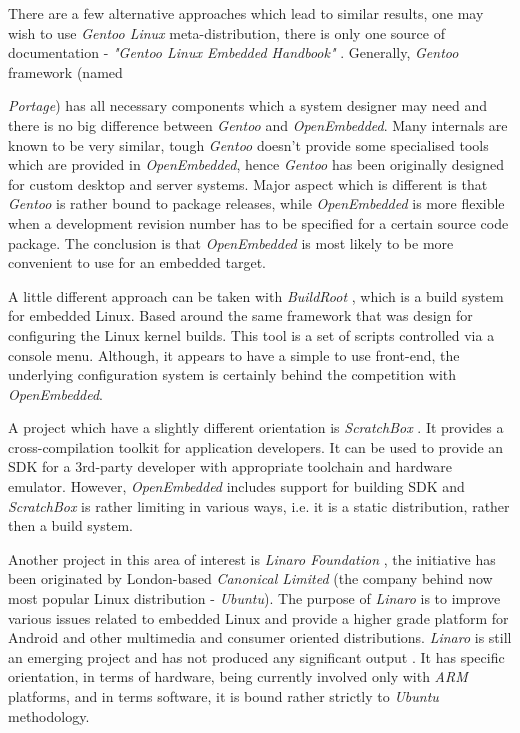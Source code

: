   There are a few alternative approaches which lead to similar results,
 one may wish to use \emph{Gentoo Linux} meta-distribution, there
 is only one source of documentation - \emph{"Gentoo Linux Embedded
 Handbook"} \cite{links:gentoo:embedded}. Generally, \emph{Gentoo}
 framework (named {\emph{Portage}) has all necessary components
 which a system designer may need and there is no big difference
 between \emph{Gentoo} and \emph{OpenEmbedded}. Many internals
 are known to be very similar, tough \emph{Gentoo} doesn't provide
 some specialised tools which are provided in \emph{OpenEmbedded},
 hence \emph{Gentoo} has been originally designed for custom
 desktop and server systems. Major aspect which is different is
 that \emph{Gentoo} is rather bound to package releases, while
 \emph{OpenEmbedded} is more flexible when a development revision
 number has to be specified for a certain source code package.
 The conclusion is that \emph{OpenEmbedded} is most likely to be
 more convenient to use for an embedded target.
 
  A little different approach can be taken with \emph{BuildRoot}
 \cite{links:buildroot:homepage}, which is a build system for
 embedded Linux. Based around the same framework that was design
 for configuring the Linux kernel builds. This tool is a set of
 scripts controlled via a console menu. Although, it appears to
 have a simple to use front-end, the underlying configuration
 system is certainly behind the competition with \emph{OpenEmbedded}.

  A project which have a slightly different orientation is
 \emph{ScratchBox} \cite{links:sbox:homepage}. It provides
 a cross-compilation toolkit for application developers.
 It can be used to provide an SDK for a 3rd-party developer
 with appropriate toolchain and hardware emulator. However,
 \emph{OpenEmbedded} includes support for building SDK and
 \emph{ScratchBox} is rather limiting in various ways, i.e.
 it is a static distribution, rather then a build system.
 
  Another project in this area of interest is \emph{Linaro Foundation}
 \cite{links:linaro:about}, the initiative has been originated by
 London-based \emph{Canonical Limited} (the company behind now most
 popular Linux distribution - \emph{Ubuntu}).
 The purpose of \emph{Linaro} is to improve various issues related to
 embedded Linux and provide a higher grade platform for Android and
 other multimedia and consumer oriented distributions. \emph{Linaro} is
 still an emerging project and has not produced any significant output
 \cite{links:linaro:homepage}. It has specific orientation, in terms of
 hardware, being currently involved only with \emph{ARM} platforms,
 and in terms software, it is bound rather strictly to \emph{Ubuntu}
 methodology.

}
